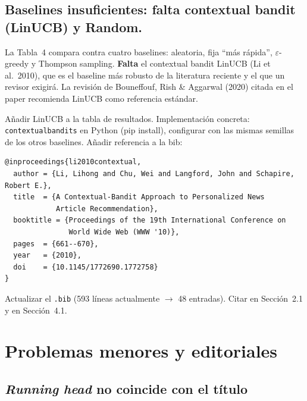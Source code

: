 \documentclass[11pt,a4paper]{article}
\begin{document}
\subsection{Baselines insuficientes: falta contextual bandit (LinUCB) y Random.}

\begin{deficiencia}[M.10 --- Deficiencia]
La Tabla~4 compara contra cuatro baselines: aleatoria, fija ``m\'as r\'apida'', $\varepsilon$-greedy y Thompson sampling. \textbf{Falta} el contextual bandit LinUCB (Li et al.~2010), que es el baseline m\'as robusto de la literatura reciente y el que un revisor exigir\'a. La revisi\'on de Bouneffouf, Rish \& Aggarwal (2020) citada en el paper recomienda LinUCB como referencia est\'andar.
\end{deficiencia}

\begin{abordaje}
A\~nadir LinUCB a la tabla de resultados. Implementaci\'on concreta: \texttt{contextualbandits} en Python (pip install), configurar con las mismas semillas de los otros baselines. A\~nadir referencia a la bib:

\begin{verbatim}
@inproceedings{li2010contextual,
  author = {Li, Lihong and Chu, Wei and Langford, John and Schapire, Robert E.},
  title  = {A Contextual-Bandit Approach to Personalized News
            Article Recommendation},
  booktitle = {Proceedings of the 19th International Conference on
               World Wide Web (WWW '10)},
  pages  = {661--670},
  year   = {2010},
  doi    = {10.1145/1772690.1772758}
}
\end{verbatim}

Actualizar el \texttt{.bib} (593 l\'ineas actualmente $\to$ 48 entradas). Citar en Secci\'on~2.1 y en Secci\'on~4.1.
\end{abordaje}

\section{Problemas menores y editoriales}

\subsection{\textit{Running head} no coincide con el t\'itulo}
\end{document}

